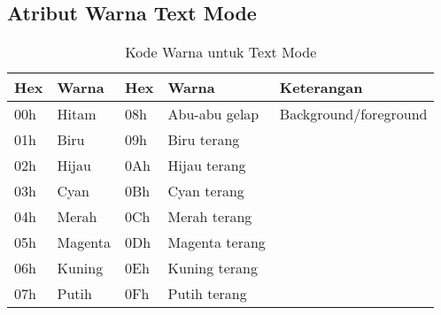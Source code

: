 \documentclass[../main.tex]{subfiles}
\begin{document}
        \subsection{Atribut Warna Text Mode}
            \begin{table}[H]
                \centering
                \caption{Kode Warna untuk Text Mode}
                \begin{tabular}{|p{1.5cm}|p{2cm}|p{1.5cm}|p{2cm}|p{6cm}|}
                    \hline
                    \textbf{Hex} & \textbf{Warna} & \textbf{Hex} & \textbf{Warna} & \textbf{Keterangan} \\
                    \hline
                    00h & Hitam & 08h & Abu-abu gelap & Background/foreground \\
                    \hline
                    01h & Biru & 09h & Biru terang & \\
                    \hline
                    02h & Hijau & 0Ah & Hijau terang & \\
                    \hline
                    03h & Cyan & 0Bh & Cyan terang & \\
                    \hline
                    04h & Merah & 0Ch & Merah terang & \\
                    \hline
                    05h & Magenta & 0Dh & Magenta terang & \\
                    \hline
                    06h & Kuning & 0Eh & Kuning terang & \\
                    \hline
                    07h & Putih & 0Fh & Putih terang & \\
                    \hline
                \end{tabular}
            \end{table}
\end{document}

